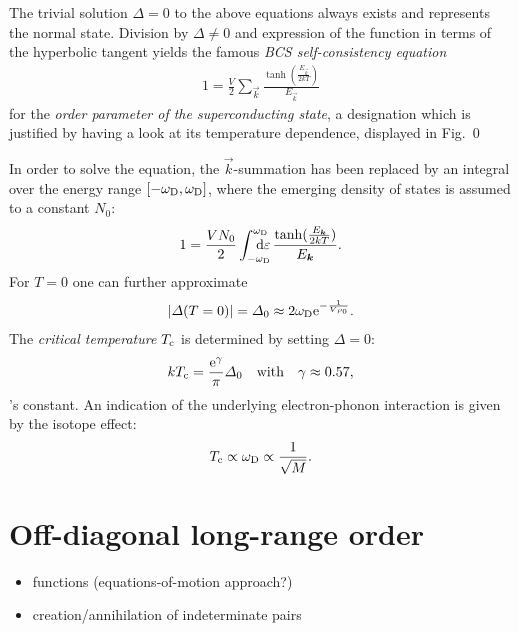 The trivial solution $\Delta = 0$ to the above equations always exists and
represents the normal state. Division by $\Delta \neq 0$ and expression of the
 function in terms of the hyperbolic tangent yields the famous
\emph{BCS self-consistency equation}
%
\begin{gather*}
    1 = \frac V 2 \sum_{\vec k}
    \frac{\tanh(\frac{E_{\vec k}}{2 k T})}{E_{\vec k}}
\end{gather*}
%
for the \emph{order parameter of the superconducting state}, a designation which
is justified by having a look at its temperature dependence, displayed in Fig.~0

In order to solve the equation, the $\vec k$-summation has been replaced by an
integral over the energy range $[-\omega \sb{\text{D}}, \omega \sb{\text{D}}]$, where the
emerging density of states is assumed to a constant $N_0$:
%
\begin{gather*}
    1 = \frac {V N_0} 2
    \int \from{-\omega \sub D} \till{\omega \sub D} \D \epsilon \,
    \frac{\tanh(\frac{E_{\vec k}}{2 k T})}{E_{\vec k}}.
\end{gather*}
%
For $T = 0$ one can further approximate
%
\begin{gather*}
    |\varDelta(T = 0)| = \varDelta_0 \approx 2 \omega \sb{\text{D}} \mathrm e^{-\frac 1 {V \rho_0}}.
\end{gather*}
%
The \emph{critical temperature} $T \sb{\text{c}}$ is determined by setting $\Delta =
0$:
%
\begin{gather*}
    k T \sb{\text{c}} = \frac {\mathrm e^\gamma} \pi \varDelta_0
    \quad \text{with} \quad \gamma \approx 0.57,
\end{gather*}
%
's constant. An indication of the underlying electron-phonon
interaction is given by the isotope effect:
%
\begin{gather*}
    T \sb{\text{c}} \propto \omega \sb{\text{D}} \propto \frac 1 {\sqrt M}.
\end{gather*}

\section{Off-diagonal long-range order}

\begin{itemize}
    \item {} functions (equations-of-motion approach?)
    \item creation/annihilation of indeterminate  pairs
\end{itemize}
